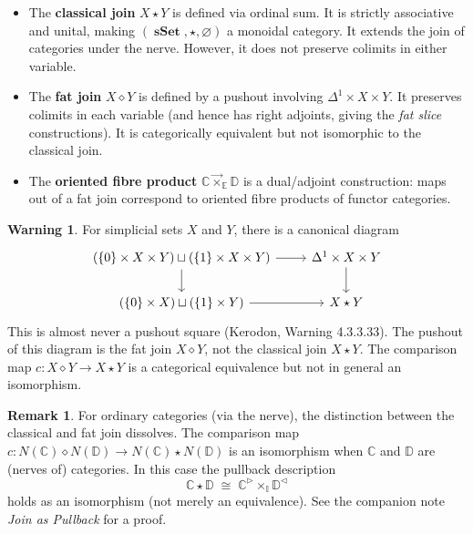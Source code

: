 \documentclass{article}
\theoremstyle{definition}
\newtheorem{remark}[proposition]{Remark}
\newtheorem{warning}[proposition]{Warning}
\newcommand{\C}{\mathbb{C}}
\newcommand{\D}{\mathbb{D}}
\newcommand{\E}{\mathbb{E}}
\newcommand{\I}{\mathbb{I}}
\DeclareMathOperator{\sSet}{\mathbf{sSet}}
\begin{document}
\begin{itemize}
	\item The \textbf{classical join} $X \star Y$ is defined via ordinal sum. It is strictly associative and unital, making $(\sSet, \star, \varnothing)$ a monoidal category. It extends the join of categories under the nerve. However, it does not preserve colimits in either variable.

	\item The \textbf{fat join} $X \diamond Y$ is defined by a pushout involving $\Delta^1 \times X \times Y$. It preserves colimits in each variable (and hence has right adjoints, giving the \emph{fat slice} constructions). It is categorically equivalent but not isomorphic to the classical join.

	\item The \textbf{oriented fibre product} $\C \vec{\times}_\E \D$ is a dual/adjoint construction: maps out of a fat join correspond to oriented fibre products of functor categories.
\end{itemize}

\begin{warning}\label{pushout-warning}
	For simplicial sets $X$ and $Y$, there is a canonical diagram
	\[\begin{tikzcd}[ampersand replacement=\&]
		{(\{0\} \times X \times Y) \sqcup (\{1\} \times X \times Y)} \& {\Delta^1 \times X \times Y} \\
		{(\{0\} \times X) \sqcup (\{1\} \times Y)} \& {X \star Y}
		\arrow[from=1-1, to=1-2]
		\arrow[from=1-1, to=2-1]
		\arrow[from=1-2, to=2-2]
		\arrow[from=2-1, to=2-2]
	\end{tikzcd}\]
	This is almost never a pushout square (Kerodon, Warning 4.3.3.33). The pushout of this diagram is the fat join $X \diamond Y$, not the classical join $X \star Y$. The comparison map $c : X \diamond Y \to X \star Y$ is a categorical equivalence but not in general an isomorphism.
\end{warning}

\begin{remark}\label{cat-case}
	For ordinary categories (via the nerve), the distinction between the classical and fat join dissolves. The comparison map $c : N(\C) \diamond N(\D) \to N(\C) \star N(\D)$ is an isomorphism when $\C$ and $\D$ are (nerves of) categories. In this case the pullback description
	\[\C \star \D \;\cong\; \C^\triangleright \times_\I \D^\triangleleft\]
	holds as an isomorphism (not merely an equivalence). See the companion note \emph{Join as Pullback} for a proof.
\end{remark}
\end{document}
